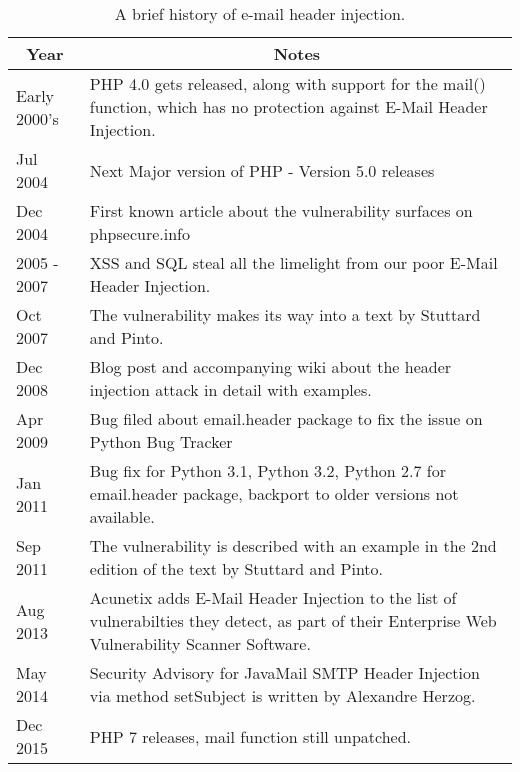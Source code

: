 \begin{table}[!htbp]
	\centering
	\begin{tabular}{|p{2cm}|p{12cm}|}
		\hline
		\multicolumn{1}{|c|}{\textbf{Year}} & \multicolumn{1}{c|}{\textbf{ Notes}}\\
		\hline

		{Early 2000's } & { PHP 4.0 gets released, along with support for the mail() function, which has no protection against E-Mail Header Injection.}\\
		\hline

		{Jul 2004} & { Next Major version of PHP - Version 5.0 releases}\\
		\hline

		{Dec 2004} & { First known article about the vulnerability surfaces on phpsecure.info}\\
		\hline

		{2005 - 2007} & {XSS and SQL steal all the limelight from our poor E-Mail Header Injection.}\\
		\hline

		{Oct 2007} & {The vulnerability makes its way into a text by Stuttard and Pinto. }\\
		\hline

		{Dec 2008} & {Blog post and accompanying wiki about the header injection attack in detail with examples.}\\
		\hline

		{Apr 2009} & {Bug filed about email.header package to fix the issue on Python Bug Tracker}\\
		\hline

		{Jan 2011} & {Bug fix for Python 3.1, Python 3.2, Python 2.7 for email.header package, backport to older versions not available.}\\
		\hline

		{Sep 2011} & {The vulnerability is described with an example in the 2nd edition of the text by Stuttard and Pinto.}\\
		\hline

		{Aug 2013} & {Acunetix adds E-Mail Header Injection to the list of vulnerabilties they detect, as part of their Enterprise Web Vulnerability Scanner Software.}\\
		\hline

		{May 2014} & {Security Advisory for JavaMail SMTP Header Injection via method setSubject is written by Alexandre Herzog.}\\
		\hline

		{Dec 2015}  & {PHP 7 releases, mail function still unpatched.}\\
		\hline
	\end{tabular}
	\caption[]{A brief history of e-mail header injection.}
	\label{tab:history}
\end{table}
